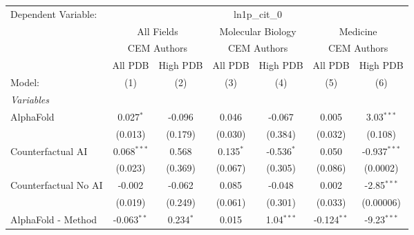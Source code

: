 \begingroup
\centering
\begin{tabular}{lcccccc}
   \tabularnewline \midrule \midrule
   Dependent Variable: & \multicolumn{6}{c}{ln1p\_cit\_0}\\
 & \multicolumn{2}{c}{All Fields} & \multicolumn{2}{c}{Molecular Biology} & \multicolumn{2}{c}{Medicine} \\
\cmidrule(lr){2-3} \cmidrule(lr){4-5} \cmidrule(lr){6-7}
 & \multicolumn{2}{c}{CEM Authors} & \multicolumn{2}{c}{CEM Authors} & \multicolumn{2}{c}{CEM Authors} \\
\cmidrule(lr){2-3} \cmidrule(lr){4-5} \cmidrule(lr){6-7}
 & \multicolumn{1}{c}{All PDB} & \multicolumn{1}{c}{High PDB} & \multicolumn{1}{c}{All PDB} & \multicolumn{1}{c}{High PDB} & \multicolumn{1}{c}{All PDB} & \multicolumn{1}{c}{High PDB} \\
\cmidrule(lr){2-2} \cmidrule(lr){3-3} \cmidrule(lr){4-4} \cmidrule(lr){5-5} \cmidrule(lr){6-6} \cmidrule(lr){7-7}
   Model:                                                     & (1)           & (2)         & (3)            & (4)          & (5)           & (6)\\  
   \midrule
   \emph{Variables}\\
   AlphaFold                                                  & 0.027$^{*}$   & -0.096      & 0.046          & -0.067       & 0.005         & 3.03$^{***}$\\   
                                                              & (0.013)       & (0.179)     & (0.030)        & (0.384)      & (0.032)       & (0.108)\\   
   Counterfactual AI                                          & 0.068$^{***}$ & 0.568       & 0.135$^{*}$    & -0.536$^{*}$ & 0.050         & -0.937$^{***}$\\   
                                                              & (0.023)       & (0.369)     & (0.067)        & (0.305)      & (0.086)       & (0.0002)\\   
   Counterfactual No AI                                       & -0.002        & -0.062      & 0.085          & -0.048       & 0.002         & -2.85$^{***}$\\   
                                                              & (0.019)       & (0.249)     & (0.061)        & (0.301)      & (0.033)       & (0.00006)\\   
   AlphaFold - Method                                         & -0.063$^{**}$ & 0.234$^{*}$ & 0.015          & 1.04$^{***}$ & -0.124$^{**}$ & -9.23$^{***}$\\   

\end{tabular}

